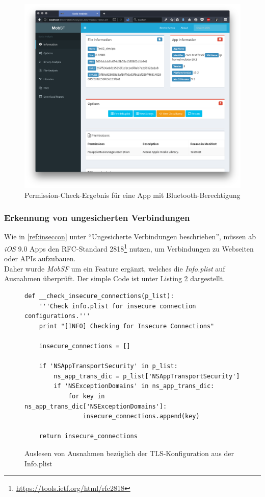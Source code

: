 \begin{figure}[htbp]
	\centering
	\includegraphics[width=\textwidth]{bilder/pentest_mobile_anwendungen/weiterentw_mobsf/permisson_check.png}
	\caption{Permission-Check-Ergebnis für eine App mit Bluetooth-Berechtigung}
	\label{fig:permission_check}
\end{figure}

\subsubsection{Erkennung von ungesicherten Verbindungen}\label{ref:WeitMobSFErkennungVonUngesichertenVerbindungen}
Wie in \ref{ref:inseccon} unter "`Ungesicherte Verbindungen beschrieben"', müssen ab \textit{iOS} 9.0 Apps den  RFC-Standard 2818\footnote{\url{https://tools.ietf.org/html/rfc2818}} nutzen, um Verbindungen zu Webseiten oder APIs aufzubauen.\\

Daher wurde \textit{MobSF} um ein Feature ergänzt, welches die \textit{Info.plist} auf Ausnahmen überprüft. Der simple Code ist unter Listing \ref{lis:NSAppTransportSecurity} dargestellt.\\

\begin{figure}
	\begin{lstlisting}
def __check_insecure_connections(p_list):
    '''Check info.plist for insecure connection configurations.'''
    print "[INFO] Checking for Insecure Connections"

    insecure_connections = []

    if 'NSAppTransportSecurity' in p_list:
        ns_app_trans_dic = p_list['NSAppTransportSecurity']
        if 'NSExceptionDomains' in ns_app_trans_dic:
            for key in ns_app_trans_dic['NSExceptionDomains']:
                insecure_connections.append(key)

    return insecure_connections
	\end{lstlisting}
	\caption{Auslesen von Ausnahmen bezüglich der TLS-Konfiguration aus der Info.plist}
	\label{lis:NSAppTransportSecurity}
\end{figure}


